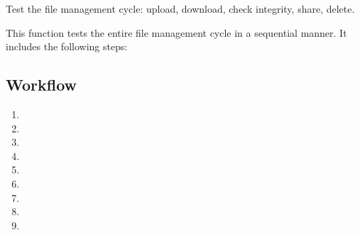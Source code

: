 \documentclass[letterpaper,10pt,english]{sphinxmanual}
\begin{document}

\begin{fulllineitems}
\label{\detokenize{file_management_cycle:file_management_cycle.test_file_management_cycle}}
\pysigstartsignatures
{}
\pysigstopsignatures
\sphinxAtStartPar
Test the file management cycle: upload, download, check integrity, share, delete.

\sphinxAtStartPar
This function tests the entire file management cycle in a sequential manner. It includes the following steps:


\subsection{Workflow}
\label{\detokenize{file_management_cycle:workflow}}\begin{enumerate}
%
\item {} 
\sphinxAtStartPar
{}

\item {} 
\sphinxAtStartPar
{}

\item {} 
\sphinxAtStartPar
{}

\item {} 
\sphinxAtStartPar
{}

\item {} 
\sphinxAtStartPar
{}

\item {} 
\sphinxAtStartPar
{}

\item {} 
\sphinxAtStartPar
{}

\item {} 
\sphinxAtStartPar
{}

\item {} 
\sphinxAtStartPar
{}

\end{enumerate}


\end{fulllineitems}
\end{document}
